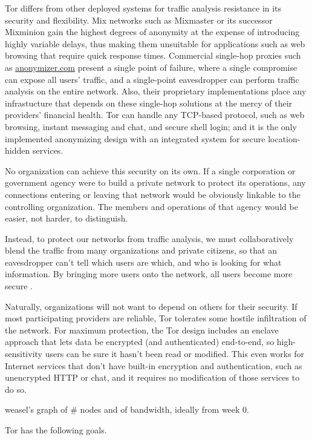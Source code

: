 \documentclass{llncs}
\begin{document}
Tor differs from other deployed systems for traffic analysis resistance
in its security and flexibility.  Mix networks such as Mixmaster or its
successor Mixminion \cite{minion-design}
gain the highest degrees of anonymity at the expense of introducing highly
variable delays, thus making them unsuitable for applications such as web
browsing that require quick response times.  Commercial single-hop proxies
such as {\url{anonymizer.com}} present a single point of failure, where
a single compromise can expose all users' traffic, and a single-point
eavesdropper can perform traffic analysis on the entire network.
Also, their proprietary implementations place any infrastucture that
depends on these single-hop solutions at the mercy of their providers'
financial health.  Tor can handle any TCP-based protocol, such as web
browsing, instant messaging and chat, and secure shell login; and it is
the only implemented anonymizing design with an integrated system for
secure location-hidden services.

No organization can achieve this security on its own.  If a single
corporation or government agency were to build a private network to
protect its operations, any connections entering or leaving that network
would be obviously linkable to the controlling organization.  The members
and operations of that agency would be easier, not harder, to distinguish.

Instead, to protect our networks from traffic analysis, we must
collaboratively blend the traffic from many organizations and private
citizens, so that an eavesdropper can't tell which users are which,
and who is looking for what information.  By bringing more users onto
the network, all users become more secure \cite{econymics}.

Naturally, organizations will not want to depend on others for their
security.  If most participating providers are reliable, Tor tolerates
some hostile infiltration of the network.  For maximum protection,
the Tor design includes an enclave approach that lets data be encrypted
(and authenticated) end-to-end, so high-sensitivity users can be sure it
hasn't been read or modified.  This even works for Internet services that
don't have built-in encryption and authentication, such as unencrypted
HTTP or chat, and it requires no modification of those services to do so.

weasel's graph of \# nodes and of bandwidth, ideally from week 0.

Tor has the following goals.
\end{document}
